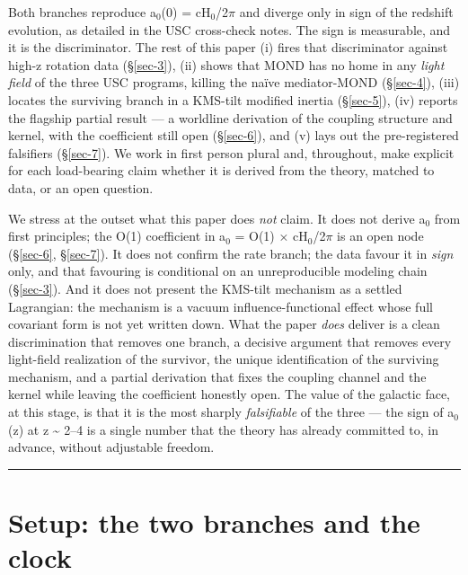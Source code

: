 \documentclass[aps,prd,preprint,nofootinbib,superscriptaddress]{revtex4-2}
\begin{document}
Both branches reproduce a\(_{0}\)(0) = cH\(_{0}\)/2\(\pi\) and diverge
only in sign of the redshift evolution, as detailed in the USC
cross-check notes. The sign is measurable, and it is the discriminator.
The rest of this paper (i) fires that discriminator against high-z
rotation data (§\ref{sec-3}), (ii) shows that MOND has no home in any
\emph{light field} of the three USC programs, killing the naïve
mediator-MOND (§\ref{sec-4}), (iii) locates the surviving branch in a
KMS-tilt modified inertia (§\ref{sec-5}), (iv) reports the flagship
partial result --- a worldline derivation of the coupling structure and
kernel, with the coefficient still open (§\ref{sec-6}), and (v) lays out
the pre-registered falsifiers (§\ref{sec-7}). We work in first person
plural and, throughout, make explicit for each load-bearing claim
whether it is derived from the theory, matched to data, or an open
question.

We stress at the outset what this paper does \emph{not} claim. It does
not derive a\(_{0}\) from first principles; the O(1) coefficient in
a\(_{0}\) = O(1) × cH\(_{0}\)/2\(\pi\) is an open node (§\ref{sec-6},
§\ref{sec-7}). It does not confirm the rate branch; the data favour it
in \emph{sign} only, and that favouring is conditional on an
unreproducible modeling chain (§\ref{sec-3}). And it does not present
the KMS-tilt mechanism as a settled Lagrangian: the mechanism is a
vacuum influence-functional effect whose full covariant form is not yet
written down. What the paper \emph{does} deliver is a clean
discrimination that removes one branch, a decisive argument that removes
every light-field realization of the survivor, the unique identification
of the surviving mechanism, and a partial derivation that fixes the
coupling channel and the kernel while leaving the coefficient honestly
open. The value of the galactic face, at this stage, is that it is the
most sharply \emph{falsifiable} of the three --- the sign of
a\(_{0}\)(z) at z \textasciitilde{} 2--4 is a single number that the
theory has already committed to, in advance, without adjustable freedom.

\begin{center}\rule{0.5\linewidth}{0.5pt}\end{center}

\section{Setup: the two branches and the clock}\label{sec-2}
\end{document}
